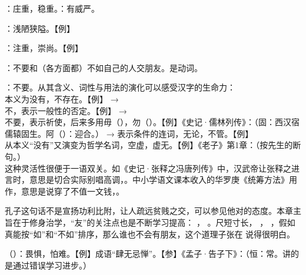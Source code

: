 {
\item {}：庄重，稳重。：有威严。
\item {}：浅陋狭隘。【例】 
\item {}：注重，崇尚。【例】 
\item {}：不要和（各方面都）不如自己的人交朋友。是动词。

：不要。从其含义、词性与用法的演化可以感受汉字的生命力：\\本义为没有，不存在。【例】  →\\不，表示一般性的否定。【例】  →\\不要，表示祈使，后来多用毋（），勿（）。【例】《史记·儒林列传》：（固：西汉宿儒辕固生。阿（）：迎合。）  → 表示条件的连词，无论，不管。【例】 \\从本义“没有”又演变为哲学名词，空虚，虚无。【例】《老子》第1章：（按先生的断句。）\\这种灵活性很便于一语双关。如《史记·张释之冯唐列传》中，汉武帝让张释之进言时，意思是切合实际别唱高调，。中小学语文课本收入的华罗庚《统筹方法》用作，意思是说穿了不值一文钱，。

孔子这句话不是宣扬功利比附，让人疏远贫贱之交，可以参见他对的态度。本章主旨在于修身治学，“友”的关注点也是不断学习提高： ， 。尺短寸长， ， ，假如真能按“如”和“不如”排序，那么谁也不会有朋友，这个道理子张在  说得很明白。


\item {}（）：畏惧，怕难。【例】成语“肆无忌惮”。【参】《孟子·告子下》：（恒：常。讲的是通过错误学习进步。）
}
{}


